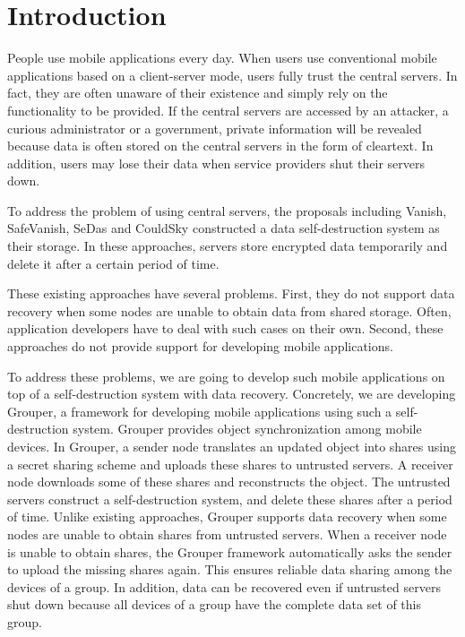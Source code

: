 \documentclass[a4paper,11pt]{report}
\begin{document}
\chapter{Introduction} \label{chapter:introduction}

People use mobile applications every day. 
When users use conventional mobile applications based on a client-server mode, users fully trust the central servers.
In fact, they are often unaware of their existence and simply rely on the functionality to be provided.
If the central servers are accessed by an attacker, a curious administrator or a government, private information will be revealed because data is often stored on the central servers in the form of cleartext.
In addition, users may lose their data when service providers shut their servers down.

To address the problem of using central servers, the proposals including Vanish\cite{geambasu2009vanish}, SafeVanish\cite{zeng2010safevanish}, SeDas\cite{zeng2012sedas} and CouldSky\cite{zeng2015cloudsky} constructed a data self-destruction system as their storage.
In these approaches, servers store encrypted data temporarily and delete it after a certain period of time.

These existing approaches have several problems.
First, they do not support data recovery when some nodes are unable to obtain data from shared storage.
Often, application developers have to deal with such cases on their own.
Second, these approaches do not provide support for developing mobile applications.

To address these problems, we are going to develop such mobile applications on top of a self-destruction system with data recovery.
Concretely, we are developing Grouper, a framework for developing mobile applications using such a self-destruction system. 
Grouper provides object synchronization among mobile devices.
In Grouper, a sender node translates an updated object into shares using a secret sharing scheme and uploads these shares to untrusted servers. 
A receiver node downloads some of these shares and reconstructs the object.
The untrusted servers construct a self-destruction system, and delete these shares after a period of time.
Unlike existing approaches, Grouper supports data recovery when some nodes are unable to obtain shares from untrusted servers.
When a receiver node is unable to obtain shares, the Grouper framework automatically asks the sender to upload the missing shares again.
This ensures reliable data sharing among the devices of a group.
In addition, data can be recovered even if untrusted servers shut down because all devices of a group have the complete data set of this group.
\end{document}
